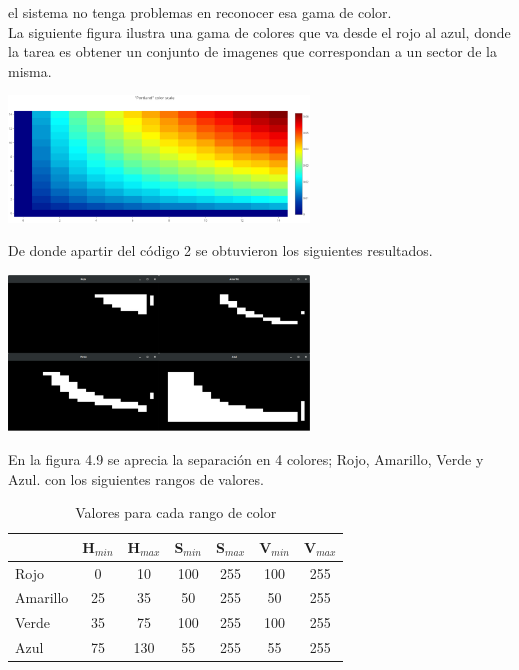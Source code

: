 el sistema no tenga problemas en reconocer esa gama de color.\\
La siguiente figura ilustra una gama de colores que va desde el rojo al azul, donde la
tarea es obtener un conjunto de imagenes que correspondan a un sector de la misma.
\begin{center}
	\includegraphics[width=0.6\textwidth]{Contenido/Cuerpo/Capitulo4/Fig4.eps}
	\label{Fig6}
\end{center}
De donde apartir del código 2 se obtuvieron los siguientes resultados.
\begin{center}
	\includegraphics[width=0.6\textwidth]{Contenido/Cuerpo/Capitulo4/Fig5.eps}
	\label{Fig6}
\end{center}
En la figura 4.9 se aprecia la separación en 4 colores; Rojo, Amarillo, Verde y Azul.
con los siguientes rangos de valores.\\
\begin{table}[ht]
	\begin{center}
		\caption{Valores para cada rango de color}
		\begin{tabular}[t]{lcccccc}
			\hline
			         & H$_{min}$ & H$_{max}$ & S$_{min}$ & S$_{max}$ & V$_{min}$ & V$_{max}$ \\
			\hline
			Rojo     & 0         & 10        & 100       & 255       & 100       & 255       \\
			Amarillo & 25        & 35        & 50        & 255       & 50        & 255       \\
			Verde    & 35        & 75        & 100       & 255       & 100       & 255       \\
			Azul     & 75        & 130       & 55        & 255       & 55        & 255       \\
			\hline
		\end{tabular}
	\end{center}
\end{table}\\
